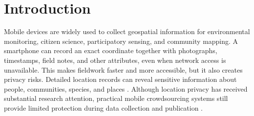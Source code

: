 \documentclass[]{interact}
\begin{document}
%

\section{Introduction}
\label{sec:introduction}

Mobile devices are widely used to collect geospatial information for environmental monitoring, citizen science, participatory sensing, and community mapping. A smartphone can record an exact coordinate together with photographs, timestamps, field notes, and other attributes, even when network access is unavailable. This makes fieldwork faster and more accessible, but it also creates privacy risks. Detailed location records can reveal sensitive information about people, communities, species, and places \citep{christin2011survey,christin2016privacy}. Although location privacy has received substantial research attention, practical mobile crowdsourcing systems still provide limited protection during data collection and publication \citep{boukoros2019lack,kim2022privacy}.
\end{document}
